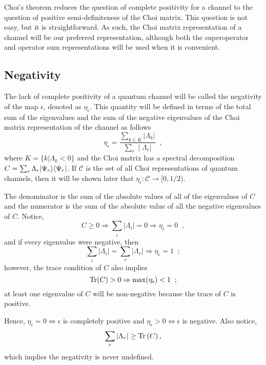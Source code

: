 Choi's theorem reduces the question of complete positivity for a channel to the question of positive semi-definiteness of the Choi matrix.  This question is not easy, but it is straightforward.  As such, the Choi matrix representation of a channel will be our preferred representation, although both the superoperator and operator sum representations will be used when it is convenient.

\subsection{Negativity}
\label{sec:neg}

The lack of complete positivity of a quantum channel will be called the negativity of the map $\epsilon$, denoted as $\eta_\epsilon$.  This quantity will be defined in terms of the total sum of the eigenvalues and the sum of the negative eigenvalues of the Choi matrix representation of the channel as follows
\begin{equation}
\label{eqn:negdef}
\eta_\epsilon = \frac{\sum_{k\in K} |\Lambda_k |}{\sum_r \;|\;\Lambda_r|}\;\;,
\end{equation}
where $K = \{k|\Lambda_k < 0\}$ and the Choi matrix has a spectral decomposition $C = \sum_r \Lambda_r |\Psi_r\rangle\langle\Psi_r|$.  If $\mathcal{C}$ is the set of all Choi representations of quantum channels, then it will be shown later that $\eta_\epsilon:\mathcal{C}\rightarrow[0,1/2)$.

The denominator is the sum of the absolute values of all of the eigenvalues of $C$ and the numerator is the sum of the absolute value of all the negative eigenvalues of $C$.  Notice,
$$
C\ge 0\Rightarrow \sum_i |\Lambda_i| = 0\Rightarrow \eta_\epsilon = 0\;\;,
$$
and if every eigenvalue were negative, then
$$
\sum_i|\Lambda_i| = \sum_r |\Lambda_r| \Rightarrow \eta_\epsilon = 1\;\;;
$$
however, the trace condition of $C$ also implies
$$
\operatorname{Tr}(C)>0\Rightarrow \max(\eta_\epsilon) < 1\;\;;
$$
at least one eigenvalue of $C$ will be non-negative because the trace of $C$ is positive.  

Hence, $\eta_\epsilon = 0 \Leftrightarrow\epsilon$ is completely positive and $\eta_\epsilon > 0 \Leftrightarrow\epsilon$ is negative.  Also notice,
$$
\sum_r |\Lambda_r| \ge \operatorname{Tr}\left(C\right),
$$
which implies the negativity is never undefined.  

